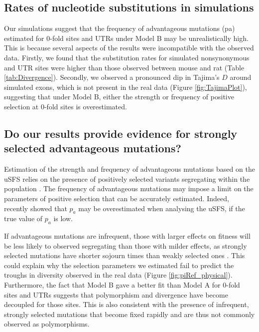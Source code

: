 \subsection{Rates of nucleotide substitutions in simulations}

	Our simulations suggest that the frequency of advantageous mutations (pa) estimated for 0-fold sites and UTRs under Model B may be unrealistically high. This is because several aspects of the results were incompatible with the observed data. Firstly, we found that the substitution rates for simulated nonsynonymous and UTR sites were higher than those observed between mouse and rat (Table \ref{tab:Divergence}). Secondly, we observed a pronounced dip in Tajima’s $D$ around simulated exons, which is not present in the real data (Figure \ref{fig:TajimaPlot}), suggesting that under Model B, either the strength or frequency of positive selection at 0-fold sites is overestimated. 

\subsection{Do our results provide evidence for strongly selected advantageous mutations?}

	Estimation of the strength and frequency of advantageous mutations based on the uSFS relies on the presence of positively selected variants segregating within the population \citep{RN201, RN210, RN354}. The frequency of advantageous mutations may impose a limit on the parameters of positive selection that can be accurately estimated. Indeed, \cite{RN354} recently showed that $p_a$ may be overestimated when analysing the uSFS, if the true value of $p_a$ is low. 

	If advantageous mutations are infrequent, those with larger effects on fitness will be less likely to observed segregating than those with milder effects, as strongly selected mutations have shorter sojourn times than weakly selected ones \cite{RN400,RN401}. This could explain why the selection parameters we estimated fail to predict the troughs in diversity observed in the real data (Figure \ref{fig:piRef_physical}). Furthermore, the fact that Model B gave a better fit than Model A for 0-fold sites and UTRs suggests that polymorphism and divergence have become decoupled for those sites. This is also consistent with the presence of infrequent, strongly selected mutations that become fixed rapidly and are thus not commonly observed as polymorphisms.

